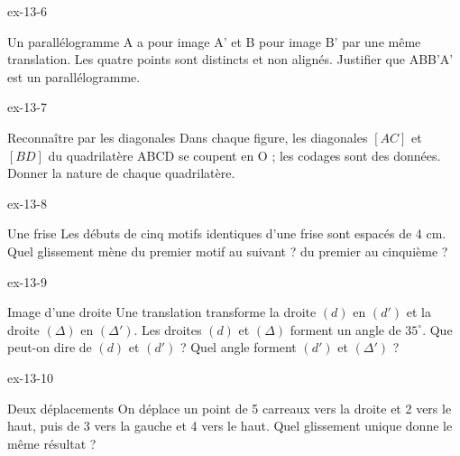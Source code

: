 \begin{blocLivre}{ex-13-6}\begin{exercice}[2]{Un parallélogramme}
A a pour image A’ et B pour image B’ par une même translation. Les quatre points sont distincts et non alignés. Justifier que ABB’A’ est un parallélogramme.
\label{fig-ex-13-6}
\end{exercice}\end{blocLivre}
\begin{blocLivre}{ex-13-7}\begin{exercice}[2]{Reconnaître par les diagonales}
Dans chaque figure, les diagonales $[AC]$ et $[BD]$ du quadrilatère ABCD se coupent en O ; les codages sont des données. Donner la nature de chaque quadrilatère.
\label{fig-ex-13-7}
\end{exercice}\end{blocLivre}
\begin{blocLivre}{ex-13-8}\begin{exercice}[2]{Une frise}
Les débuts de cinq motifs identiques d’une frise sont espacés de 4 cm. Quel glissement mène du premier motif au suivant ? du premier au cinquième ?
\label{fig-ex-13-8}
\end{exercice}\end{blocLivre}
\begin{blocLivre}{ex-13-9}\begin{exercice}[2]{Image d’une droite}
Une translation transforme la droite $(d)$ en $(d')$ et la droite $(\Delta)$ en $(\Delta')$. Les droites $(d)$ et $(\Delta)$ forment un angle de $35^\circ$. Que peut-on dire de $(d)$ et $(d')$ ? Quel angle forment $(d')$ et $(\Delta')$ ?
\label{fig-ex-13-9}
\end{exercice}\end{blocLivre}
\begin{blocLivre}{ex-13-10}\begin{exercice}[2]{Deux déplacements}
On déplace un point de 5 carreaux vers la droite et 2 vers le haut, puis de 3 vers la gauche et 4 vers le haut. Quel glissement unique donne le même résultat ?
\label{fig-ex-13-10}
\end{exercice}\end{blocLivre}


